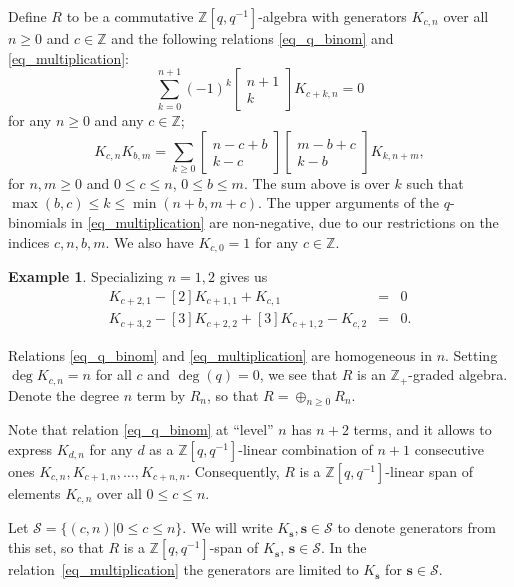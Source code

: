 \documentclass{article}
\def\Z{\mathbb Z}
\newcommand{\mcS}{\mathcal{S}}
\newcommand{\mbs}{\mathbf{s}}
\newcommand{\bbinom}[2]{
  \begin{bmatrix}
    #1 \\
    #2
  \end{bmatrix}
}
\theoremstyle{definition}
\newtheorem{example}[thm]{Example}
\theoremstyle{definition}
\begin{document}
Define $R$ to be a commutative $\Z[q,q^{-1}]$-algebra
with generators $K_{c,n}$ over all $n\ge 0$ and $c\in \Z$ and the following relations \eqref{eq_q_binom} and \eqref{eq_multiplication}:
\begin{equation}\label{eq_q_binom}
    \sum_{k=0}^{n+1} (-1)^k \bbinom{n+1}{k} K_{c+k,n} =0
\end{equation}
for any $n\ge 0$ and any $c\in \Z$;
\begin{equation}\label{eq_multiplication}
K_{c,n}K_{b,m} = \sum_{k \ge 0} \begin{bmatrix} n - c + b \\ k - c \end{bmatrix} \begin{bmatrix} m - b + c \\ k - b \end{bmatrix}
K_{k,n+m},
\end{equation}
for $n,m\ge 0$ and $0\le c\le n$, $0\le b\le m$. The sum above is over $k$ such that $\max(b,c) \le k \le  \min(n+b, m+c)$.
The upper arguments of the $q$-binomials in \eqref{eq_multiplication} are non-negative, due to our restrictions on the indices $c,n,b,m$. We also have $K_{c,0}=1$ for any $c\in \Z$.

\begin{example}\label{example_motivate}
Specializing $n=1,2$ gives us
\begin{eqnarray*}
K_{c+2,1}- [2]K_{c+1,1}+ K_{c,1} & = & 0 \\
K_{c+3,2}-[3]K_{c+2,2}+[3]K_{c+1,2} - K_{c,2} & = & 0 .
\end{eqnarray*}
\end{example}

Relations \eqref{eq_q_binom} and \eqref{eq_multiplication} are homogeneous in $n$. Setting $\deg K_{c,n}=n$ for all $c$ and $\deg(q)=0$, we see that $R$ is an $\Z_+$-graded algebra. Denote the degree $n$ term by $R_n$, so that $R=\oplus_{n\ge 0}R_n$.

Note that
relation \eqref{eq_q_binom} at ``level'' $n$ has $n+2$ terms, and it allows to express $K_{d,n}$ for any $d$ as a $\Z[q,q^{-1}]$-linear combination of $n+1$ consecutive ones $K_{c,n},K_{c+1,n},\dots, K_{c+n,n}$. Consequently, $R$ is a $\Z[q,q^{-1}]$-linear span of elements $K_{c,n}$ over all $0\le c\le n$.

Let $\mcS=\{(c,n)|0\le c\le n\}$.
We will write $K_{\mbs}, \mbs\in\mcS$ to denote generators from this set, so that $R$ is a $\Z[q,q^{-1}]$-span of $K_{\mbs}$, $\mbs\in \mcS$.
In the relation~\eqref{eq_multiplication} the generators are limited to $K_{\mbs}$ for $\mbs\in \mcS$.
\end{document}
